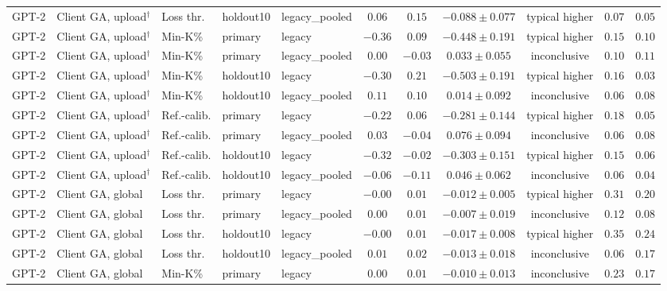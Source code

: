 \begin{table}[t]
\begin{tabular*}{\textwidth}{@{\extracolsep{\fill}}lllllcccccc@{}}
GPT-2 & Client GA, upload$^{\dagger}$ & Loss thr. & holdout10 & legacy\_pooled & $0.06$ & $0.15$ & $-0.088 \pm 0.077$ & typical higher & $0.07$ & $0.05$ \\
GPT-2 & Client GA, upload$^{\dagger}$ & Min-K\% & primary & legacy & $-0.36$ & $0.09$ & $-0.448 \pm 0.191$ & typical higher & $0.15$ & $0.10$ \\
GPT-2 & Client GA, upload$^{\dagger}$ & Min-K\% & primary & legacy\_pooled & $0.00$ & $-0.03$ & $0.033 \pm 0.055$ & inconclusive & $0.10$ & $0.11$ \\
GPT-2 & Client GA, upload$^{\dagger}$ & Min-K\% & holdout10 & legacy & $-0.30$ & $0.21$ & $-0.503 \pm 0.191$ & typical higher & $0.16$ & $0.03$ \\
GPT-2 & Client GA, upload$^{\dagger}$ & Min-K\% & holdout10 & legacy\_pooled & $0.11$ & $0.10$ & $0.014 \pm 0.092$ & inconclusive & $0.06$ & $0.08$ \\
GPT-2 & Client GA, upload$^{\dagger}$ & Ref.-calib. & primary & legacy & $-0.22$ & $0.06$ & $-0.281 \pm 0.144$ & typical higher & $0.18$ & $0.05$ \\
GPT-2 & Client GA, upload$^{\dagger}$ & Ref.-calib. & primary & legacy\_pooled & $0.03$ & $-0.04$ & $0.076 \pm 0.094$ & inconclusive & $0.06$ & $0.08$ \\
GPT-2 & Client GA, upload$^{\dagger}$ & Ref.-calib. & holdout10 & legacy & $-0.32$ & $-0.02$ & $-0.303 \pm 0.151$ & typical higher & $0.15$ & $0.06$ \\
GPT-2 & Client GA, upload$^{\dagger}$ & Ref.-calib. & holdout10 & legacy\_pooled & $-0.06$ & $-0.11$ & $0.046 \pm 0.062$ & inconclusive & $0.06$ & $0.04$ \\
GPT-2 & Client GA, global & Loss thr. & primary & legacy & $-0.00$ & $0.01$ & $-0.012 \pm 0.005$ & typical higher & $0.31$ & $0.20$ \\
GPT-2 & Client GA, global & Loss thr. & primary & legacy\_pooled & $0.00$ & $0.01$ & $-0.007 \pm 0.019$ & inconclusive & $0.12$ & $0.08$ \\
GPT-2 & Client GA, global & Loss thr. & holdout10 & legacy & $-0.00$ & $0.01$ & $-0.017 \pm 0.008$ & typical higher & $0.35$ & $0.24$ \\
GPT-2 & Client GA, global & Loss thr. & holdout10 & legacy\_pooled & $0.01$ & $0.02$ & $-0.013 \pm 0.018$ & inconclusive & $0.06$ & $0.17$ \\
GPT-2 & Client GA, global & Min-K\% & primary & legacy & $0.00$ & $0.01$ & $-0.010 \pm 0.013$ & inconclusive & $0.23$ & $0.17$ \\

\end{tabular*}
\end{table}
